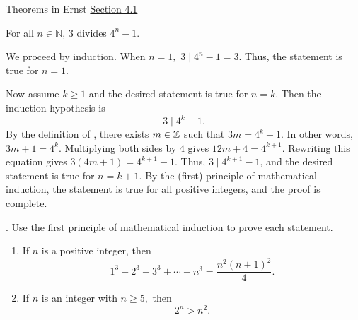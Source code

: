 \documentclass{ximera}
\begin{document}
\begin{br}
Theorems in Ernst \href{https://danaernst.com/IBL-IntroToProof/pretext/sec_Intro_to_Induction.html}{Section 4.1} 
 

\begin{theorem}
For all $n\in\mathbb{N}$, 3 divides $4^{n}-1$.
\end{theorem}
\begin{solution}
We proceed by induction.  When $n=1,$ $3\mid 4^n-1=3$. Thus, the statement is true for $n=1.$

Now assume $k\geq 1$ and the desired statement is true for $n=k$. Then the induction hypothesis is \[3\mid 4^k-1.\]
By the definition of , there exists $m\in\mathbb Z$ such that $3m=4^k-1.$ In other words, $3m+1=4^k$. Multiplying both sides by $4$ gives $12m+4=4^{k+1}$. Rewriting this equation gives $3(4m+1)=4^{k+1}-1$. Thus, $3\mid 4^{k+1}-1$, and the desired statement is true for $n=k+1$. By the (first) principle of mathematical induction, the statement is true for all positive integers, and the proof is complete.
\end{solution}

 
\end{br}

\begin{br}
. Use the first principle of mathematical induction to prove each statement.
  \begin{enumerate}
    \item If $n$ is a positive integer, then 
  \[1^3+2^3+3^3+\cdots+n^3=\frac{n^2(n+1)^2}{4}.\]
  
    \item If $n$ is an integer with $n\geq 5,$ then \[2^n>n^2.\]
 
  \end{enumerate}
\end{br}







\end{document}
